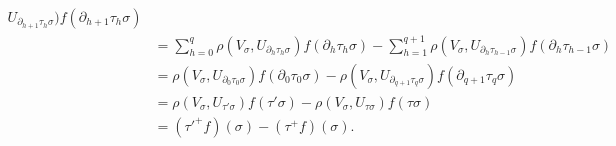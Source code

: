 \begin{align*}
  U_{\partial_{h+1} \tau_h \sigma}) f(\partial_{h+1} \tau_h \sigma)\\ 
 & = \sum^{q}_{h=0} \rho (V_\sigma , U_{\partial_h \tau_h \sigma})
  f(\partial_h \tau_h \sigma) - \sum^{q+1}_{h=1} \rho(V_{\sigma},
  U_{\partial_{h} \tau_{h-1} \sigma}) f(\partial_h \tau_{h-1}
  \sigma)\\ 
 & =  \rho (V_\sigma , U_{\partial_0 \tau_0 \sigma})  f(\partial_0
  \tau_0 \sigma) -  \rho (V_\sigma , U_{\partial_{q+1} \tau_q \sigma})
  f(\partial_{q+1} \tau_q \sigma)\\ 
 & =  \rho (V_\sigma , U_{\tau ' \sigma})  f(\tau ' \sigma) -  \rho
  (V_\sigma , U_{\tau \sigma})  f(\tau  \sigma)\\ 
 & =(\tau'^+ f) (\sigma ) - (\tau^+ f) (\sigma ). 
\end{align*}\pageoriginale

